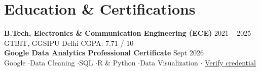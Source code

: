 \documentclass[10pt,a4paper]{article}
\newcommand{\sep}{\;$\cdot$\;}
\begin{document}
\section{Education \& Certifications}

\textbf{B.Tech, Electronics \& Communication Engineering (ECE)} \hfill {\small 2021 -- 2025}\\
{\small GTBIT, GGSIPU Delhi} \hfill {\small CGPA: 7.71 / 10}\\[2pt]


\textbf{Google Data Analytics Professional Certificate} \hfill {\small Sept 2026}\\
{\small Google \sep Data Cleaning \sep SQL \sep R \& Python \sep Data Visualization \sep
  \href{https://drive.google.com/file/d/14Zjb03LreuKHPV159e3-3ucDxii6RKds/view?usp=sharing}{Verify credential}}
\end{document}
